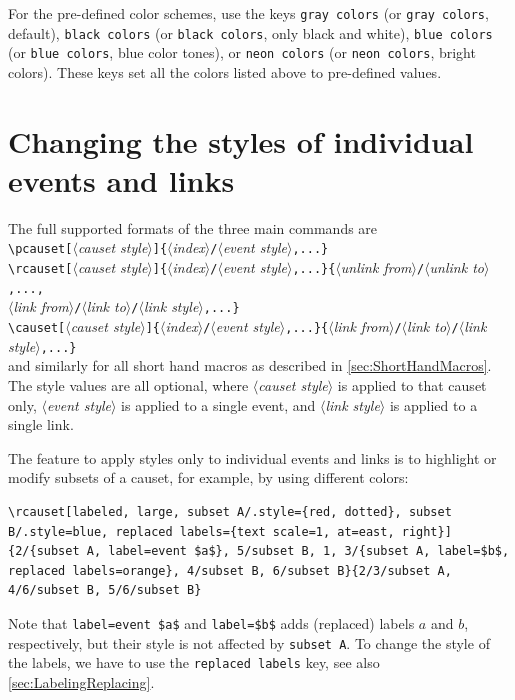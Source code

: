 \documentclass[12pt]{article}
\newcommand*{\PH}[1][value]{{\small\itshape$\langle$#1$\rangle$}} %
\begin{document}
For the pre-defined color schemes, use the keys \lstinline&gray colors& (or \lstinline&gray colors&, default), \lstinline&black colors& (or \lstinline&black colors&, only black and white), \lstinline&blue colors& (or \lstinline&blue colors&, blue color tones), or \lstinline&neon colors& (or \lstinline&neon colors&, bright colors).
These keys set all the colors listed above to pre-defined values.


\section{Changing the styles of individual events and links}
\label{sec:LocalStyles}

The full supported formats of the three main commands are
\\[1ex]
\lstinline&\pcauset[&\PH[causet style]\lstinline&]{&\PH[index]\lstinline&/&\PH[event style]\lstinline&,...}&
\\[1ex]
\lstinline&\rcauset[&\PH[causet style]\lstinline&]{&\PH[index]\lstinline&/&\PH[event style]\lstinline&,...}{&\PH[unlink from]\lstinline&/&\PH[unlink to]\lstinline&,...,&
\\\PH[link from]\lstinline&/&\PH[link to]\lstinline&/&\PH[link style]\lstinline&,...}&
\\[1ex]
\lstinline&\causet[&\PH[causet style]\lstinline&]{&\PH[index]\lstinline&/&\PH[event style]\lstinline&,...}{&\PH[link from]\lstinline&/&\PH[link to]\lstinline&/&\PH[link style]\lstinline&,...}&
\\[1ex]
and similarly for all short hand macros as described in \autoref{sec:ShortHandMacros}.
The style values are all optional, where \PH[causet style] is applied to that causet only, \PH[event style] is applied to a single event, and \PH[link style] is applied to a single link.

The feature to apply styles only to individual events and links is to highlight or modify subsets of a causet, for example, by using different colors: 
\begin{lstlisting}
\rcauset[labeled, large, subset A/.style={red, dotted}, subset B/.style=blue, replaced labels={text scale=1, at=east, right}]{2/{subset A, label=event $a$}, 5/subset B, 1, 3/{subset A, label=$b$, replaced labels=orange}, 4/subset B, 6/subset B}{2/3/subset A, 4/6/subset B, 5/6/subset B}
\end{lstlisting}
\vspace{-1ex}
\begin{center}
\end{center}
Note that \lstinline&label=event $a$& and \lstinline&label=$b$& adds (replaced) labels $a$ and $b$, respectively, but their style is not affected by \lstinline&subset A&.
To change the style of the labels, we have to use the \lstinline&replaced labels& key, see also \autoref{sec:LabelingReplacing}.
\end{document}
